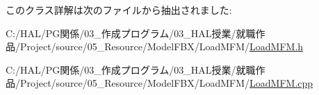 このクラス詳解は次のファイルから抽出されました\+:\begin{DoxyCompactItemize}
\item 
C\+:/\+H\+A\+L/\+P\+G関係/03\+\_\+作成プログラム/03\+\_\+\+H\+A\+L授業/就職作品/\+Project/source/05\+\_\+\+Resource/\+Model\+F\+B\+X/\+Load\+M\+F\+M/\mbox{\hyperlink{_load_m_f_m_8h}{Load\+M\+F\+M.\+h}}\item 
C\+:/\+H\+A\+L/\+P\+G関係/03\+\_\+作成プログラム/03\+\_\+\+H\+A\+L授業/就職作品/\+Project/source/05\+\_\+\+Resource/\+Model\+F\+B\+X/\+Load\+M\+F\+M/\mbox{\hyperlink{_load_m_f_m_8cpp}{Load\+M\+F\+M.\+cpp}}\end{DoxyCompactItemize}
